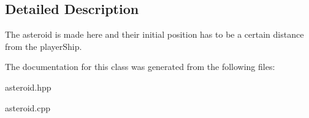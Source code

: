 \subsection{Detailed Description}
The asteroid is made here and their initial position has to be a certain distance from the player\+Ship. 

The documentation for this class was generated from the following files\+:\begin{DoxyCompactItemize}
\item 
asteroid.\+hpp\item 
asteroid.\+cpp\end{DoxyCompactItemize}
